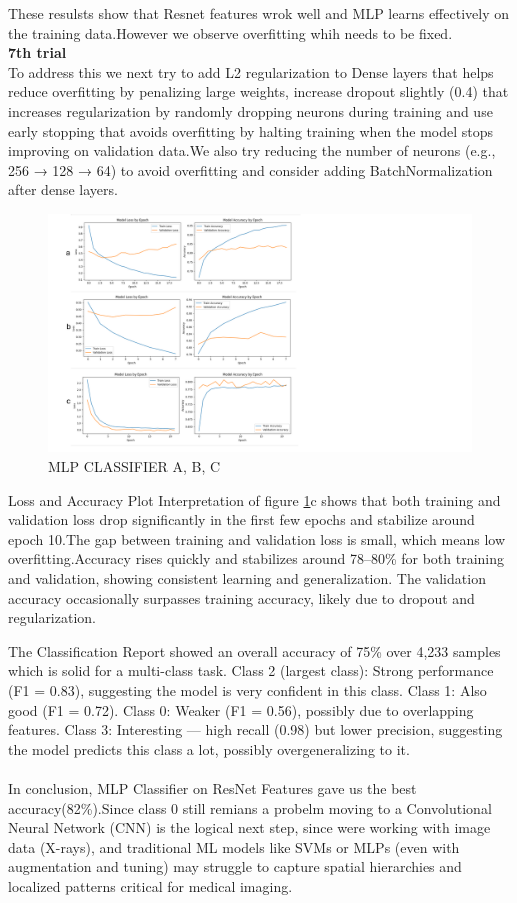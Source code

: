 \documentclass{article}
\begin{document}
These resulsts show that Resnet features wrok well and MLP learns effectively on the training data.However we observe overfitting whih needs to be fixed.\\
\textbf{7th trial }\\
To address this we next try to add L2 regularization to Dense layers that helps reduce overfitting by penalizing large weights, increase dropout slightly (0.4) that increases regularization by randomly dropping neurons during training and use early stopping that avoids overfitting by halting training when the model stops improving on validation data.We also try reducing the number of neurons (e.g., 256 → 128 → 64) to avoid overfitting and consider adding BatchNormalization after dense layers.
\begin{figure}[ht] %
    \centering
    \includegraphics[width=1.0\linewidth]{comparemlp2.png}
    \caption{MLP CLASSIFIER A, B, C}
    \label{fig:MLP_CLASSIFIER_compare}
\end{figure}
Loss and Accuracy Plot Interpretation of figure \ref{fig:MLP_CLASSIFIER_compare}c shows that both training and validation loss drop significantly in the first few epochs and stabilize around epoch 10.The gap between training and validation loss is small, which means low overfitting.Accuracy rises quickly and stabilizes around 78–80\% for both training and validation, showing consistent learning and generalization.
The validation accuracy occasionally surpasses training accuracy, likely due to dropout and regularization.

The Classification Report showed an overall accuracy of 75\% over 4,233 samples which is solid for a multi-class task.
Class 2 (largest class): Strong performance (F1 = 0.83), suggesting the model is very confident in this class.
Class 1: Also good (F1 = 0.72).
Class 0: Weaker (F1 = 0.56), possibly due to overlapping features.
Class 3: Interesting — high recall (0.98) but lower precision, suggesting the model predicts this class a lot, possibly overgeneralizing to it.\\
\\
In conclusion, MLP Classifier on ResNet Features gave us the best accuracy(82\%).Since class 0 still remians a probelm moving to a Convolutional Neural Network (CNN) is the logical next step, since were working with image data (X-rays), and traditional ML models like SVMs or MLPs (even with augmentation and tuning) may struggle to capture spatial hierarchies and localized patterns critical for medical imaging.\\
\end{document}
